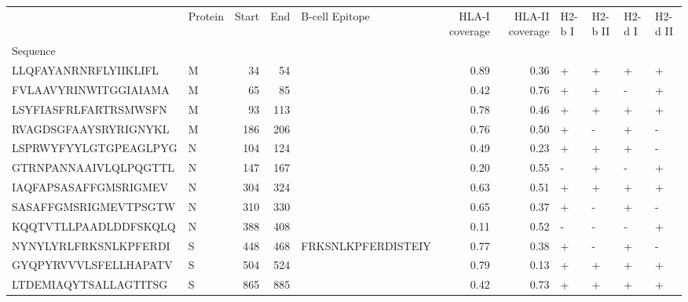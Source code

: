 \begin{tabular}{llrrlrrllll}
\toprule
{} & Protein &  Start &   End &      B-cell Epitope &  HLA-I coverage &  HLA-II coverage & H2-b I & H2-b II & H2-d I & H2-d II \\
Sequence              &         &        &       &                     &                 &                  &        &         &        &         \\
\midrule
LLQFAYANRNRFLYIIKLIFL &       M &     34 &    54 &                     &            0.89 &             0.36 &      + &       + &      + &       + \\
FVLAAVYRINWITGGIAIAMA &       M &     65 &    85 &                     &            0.42 &             0.76 &      + &       + &      - &       + \\
LSYFIASFRLFARTRSMWSFN &       M &     93 &   113 &                     &            0.78 &             0.46 &      + &       + &      + &       + \\
RVAGDSGFAAYSRYRIGNYKL &       M &    186 &   206 &                     &            0.76 &             0.50 &      + &       - &      + &       - \\
LSPRWYFYYLGTGPEAGLPYG &       N &    104 &   124 &                     &            0.49 &             0.23 &      + &       + &      + &       - \\
GTRNPANNAAIVLQLPQGTTL &       N &    147 &   167 &                     &            0.20 &             0.55 &      - &       + &      - &       + \\
IAQFAPSASAFFGMSRIGMEV &       N &    304 &   324 &                     &            0.63 &             0.51 &      + &       + &      + &       + \\
SASAFFGMSRIGMEVTPSGTW &       N &    310 &   330 &                     &            0.65 &             0.37 &      + &       - &      + &       - \\
KQQTVTLLPAADLDDFSKQLQ &       N &    388 &   408 &                     &            0.11 &             0.52 &      - &       - &      - &       + \\
NYNYLYRLFRKSNLKPFERDI &       S &    448 &   468 &  FRKSNLKPFERDISTEIY &            0.77 &             0.38 &      + &       - &      + &       - \\
GYQPYRVVVLSFELLHAPATV &       S &    504 &   524 &                     &            0.79 &             0.13 &      + &       + &      + &       + \\
LTDEMIAQYTSALLAGTITSG &       S &    865 &   885 &                     &            0.42 &             0.73 &      + &       + &      + &       + \\

\end{tabular}
